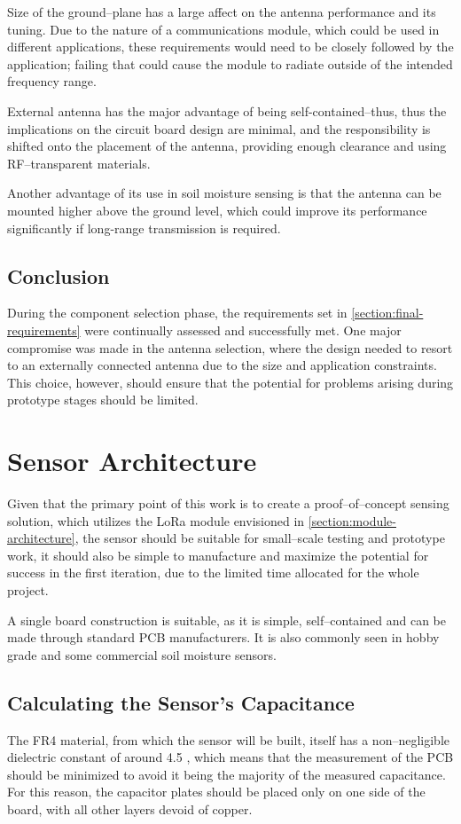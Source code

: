 Size of the ground--plane has a large affect on the antenna performance and its tuning. Due to the nature of a communications module, which could be used in different applications, these requirements would need to be closely followed by the application; failing that could cause the module to radiate outside of the intended frequency range.

External antenna has the major advantage of being self-contained--thus, thus the implications on the circuit board design are minimal, and the responsibility is shifted onto the placement of the antenna, providing enough clearance and using RF--transparent materials.

Another advantage of its use in soil moisture sensing is that the antenna can be mounted higher above the ground level, which could improve its performance significantly if long-range transmission is required.

\subsection{Conclusion}
During the component selection phase, the requirements set in \ref{section:final-requirements} were continually assessed and successfully met. One major compromise was made in the antenna selection, where the design needed to resort to an externally connected antenna due to the size and application constraints. This choice, however, should ensure that the potential for problems arising during prototype stages should be limited.

\FloatBarrier
\section{Sensor Architecture}
Given that the primary point of this work is to create a proof--of--concept sensing solution, which utilizes the LoRa module envisioned in \ref{section:module-architecture}, the sensor should be suitable for small--scale testing and prototype work, it should also be simple to manufacture and maximize the potential for success in the first iteration, due to the limited time allocated for the whole project.

A single board construction is suitable, as it is simple, self--contained and can be made through standard PCB manufacturers. It is also commonly seen in hobby grade and some commercial soil moisture sensors.

\subsection{\label{section:expected-cap}Calculating the Sensor's Capacitance}
The FR4 material, from which the sensor will be built, itself has a non--negligible dielectric constant of around 4.5 \cite{pcbway_stackup_2024}, which means that the measurement of the PCB should be minimized to avoid it being the majority of the measured capacitance. For this reason, the capacitor plates should be placed only on one side of the board, with all other layers devoid of copper.


